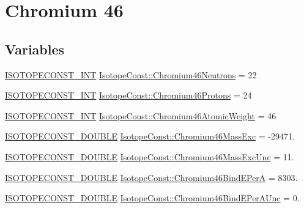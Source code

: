 \hypertarget{group___isotope_const-_chromium-_cr46}{}\section{Chromium 46}
\label{group___isotope_const-_chromium-_cr46}
\subsection*{Variables}
\begin{DoxyCompactItemize}
\item 
\mbox{\hyperlink{group___isotope_const-_macros_ga5f18360b3e99483a35c32d789e62621c}{I\+S\+O\+T\+O\+P\+E\+C\+O\+N\+S\+T\+\_\+\+I\+NT}} \mbox{\hyperlink{group___isotope_const-_chromium-_cr46_ga71ba0f21ccbe300cd00c4c3d405aaef0}{Isotope\+Const\+::\+Chromium46\+Neutrons}} = 22
\item 
\mbox{\hyperlink{group___isotope_const-_macros_ga5f18360b3e99483a35c32d789e62621c}{I\+S\+O\+T\+O\+P\+E\+C\+O\+N\+S\+T\+\_\+\+I\+NT}} \mbox{\hyperlink{group___isotope_const-_chromium-_cr46_ga9a2edfb6469e250f48327fd1727b5823}{Isotope\+Const\+::\+Chromium46\+Protons}} = 24
\item 
\mbox{\hyperlink{group___isotope_const-_macros_ga5f18360b3e99483a35c32d789e62621c}{I\+S\+O\+T\+O\+P\+E\+C\+O\+N\+S\+T\+\_\+\+I\+NT}} \mbox{\hyperlink{group___isotope_const-_chromium-_cr46_ga1159154e3f98089bef39c98c4f4e4376}{Isotope\+Const\+::\+Chromium46\+Atomic\+Weight}} = 46
\item 
\mbox{\hyperlink{group___isotope_const-_macros_ga8f45a7272ce02c0b4c65c44636ed719a}{I\+S\+O\+T\+O\+P\+E\+C\+O\+N\+S\+T\+\_\+\+D\+O\+U\+B\+LE}} \mbox{\hyperlink{group___isotope_const-_chromium-_cr46_ga8198d77728825d12ae8d3a9a1bd065a8}{Isotope\+Const\+::\+Chromium46\+Mass\+Exc}} = -\/29471.
\item 
\mbox{\hyperlink{group___isotope_const-_macros_ga8f45a7272ce02c0b4c65c44636ed719a}{I\+S\+O\+T\+O\+P\+E\+C\+O\+N\+S\+T\+\_\+\+D\+O\+U\+B\+LE}} \mbox{\hyperlink{group___isotope_const-_chromium-_cr46_gad22454293763887fb4af868027c31293}{Isotope\+Const\+::\+Chromium46\+Mass\+Exc\+Unc}} = 11.
\item 
\mbox{\hyperlink{group___isotope_const-_macros_ga8f45a7272ce02c0b4c65c44636ed719a}{I\+S\+O\+T\+O\+P\+E\+C\+O\+N\+S\+T\+\_\+\+D\+O\+U\+B\+LE}} \mbox{\hyperlink{group___isotope_const-_chromium-_cr46_ga2101f5c5b963d6459bfc0642289d3401}{Isotope\+Const\+::\+Chromium46\+Bind\+E\+PerA}} = 8303.
\item 
\mbox{\hyperlink{group___isotope_const-_macros_ga8f45a7272ce02c0b4c65c44636ed719a}{I\+S\+O\+T\+O\+P\+E\+C\+O\+N\+S\+T\+\_\+\+D\+O\+U\+B\+LE}} \mbox{\hyperlink{group___isotope_const-_chromium-_cr46_ga6a7977fd26fb92592d80d3afcd637f50}{Isotope\+Const\+::\+Chromium46\+Bind\+E\+Per\+A\+Unc}} = 0.

\end{DoxyCompactItemize}
